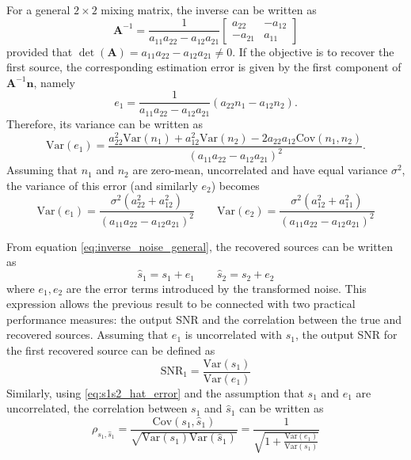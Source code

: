 For a general $2\times 2$ mixing matrix, the inverse can be written as
\begin{equation}
\mathbf{A}^{-1}
=
\frac{1}{a_{11}a_{22}-a_{12}a_{21}}
\begin{bmatrix}
a_{22} & -a_{12}\\
-a_{21} & a_{11}
\end{bmatrix}
\label{eq:inverse_A_general}
\end{equation}
provided that $\det(\mathbf{A})=a_{11}a_{22}-a_{12}a_{21}\neq 0$. 
If the objective is to recover the first source, the corresponding estimation error is given by the first component of $\mathbf{A}^{-1}\mathbf{n}$, namely
\begin{equation}
e_1=
\frac{1}{a_{11}a_{22}-a_{12}a_{21}}
\left(a_{22}n_1-a_{12}n_2\right).
\label{eq:e1_general}
\end{equation}Therefore, its variance can be written as
\begin{equation}
\mathrm{Var}(e_1)=
\frac{
a_{22}^2\mathrm{Var}(n_1)
+a_{12}^2\mathrm{Var}(n_2)
-2a_{22}a_{12}\mathrm{Cov}(n_1,n_2)
}{
\left(a_{11}a_{22}-a_{12}a_{21}\right)^2
}.
\label{eq:var_e1_expanded}
\end{equation}
Assuming that $n_1$ and $n_2$ are zero-mean, uncorrelated and have equal variance $\sigma^2$, the variance of this error (and similarly $e_2$) becomes
\begin{equation}
\mathrm{Var}(e_1)=
\frac{\sigma^2\left(a_{22}^2+a_{12}^2\right)}
{\left(a_{11}a_{22}-a_{12}a_{21}\right)^2} \qquad
\mathrm{Var}(e_2)=
\frac{\sigma^2\left(a_{12}^2+a_{11}^2\right)}
{\left(a_{11}a_{22}-a_{12}a_{21}\right)^2}
\label{eq:var_e1_e2_general}
\end{equation}

From equation \eqref{eq:inverse_noise_general}, the recovered sources can be written as
\begin{equation}
\hat{s}_1 = s_1 + e_1 \qquad
\hat{s}_2 = s_2 + e_2
\label{eq:s1s2_hat_error}
\end{equation}
where $e_1,e_2$ are the error terms introduced by the transformed noise. This expression allows the previous result to be connected with two practical performance measures: the output SNR and the correlation between the true and recovered sources.
Assuming that $e_1$ is uncorrelated with $s_1$, the output SNR for the first recovered source can be defined as
\begin{equation}
\mathrm{SNR}_1=\frac{\mathrm{Var}(s_1)}{\mathrm{Var}(e_1)}
\label{eq:snr1_def}
\end{equation}
Similarly, using \eqref{eq:s1s2_hat_error} and the assumption that $s_1$ and $e_1$ are uncorrelated, the correlation between $s_1$ and $\hat{s}_1$ can be written as
\begin{equation}
\rho_{s_1,\hat{s}_1}=
\frac{\mathrm{Cov}(s_1,\hat{s}_1)}
{\sqrt{\mathrm{Var}(s_1)\mathrm{Var}(\hat{s}_1)}} = \frac{1}{\sqrt{1+\frac{\mathrm{Var}(e_1)}{\mathrm{Var}(s_1)}}}
\label{eq:corr_def}
\end{equation}

